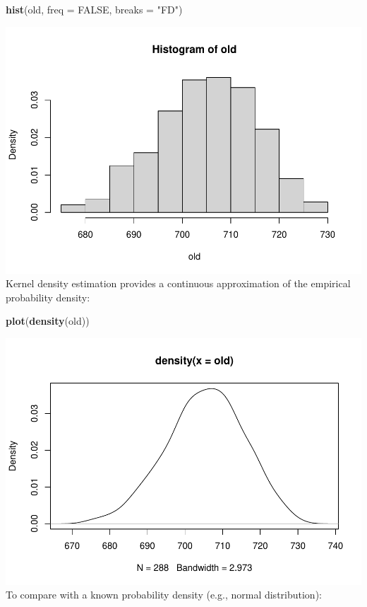 \documentclass[
]{article}
\newenvironment{Shaded}{\begin{snugshade}}{\end{snugshade}}
\newcommand{\AttributeTok}[1]{\textcolor[rgb]{0.13,0.29,0.53}{#1}}
\newcommand{\ConstantTok}[1]{\textcolor[rgb]{0.56,0.35,0.01}{#1}}
\newcommand{\FunctionTok}[1]{\textcolor[rgb]{0.13,0.29,0.53}{\textbf{#1}}}
\newcommand{\NormalTok}[1]{#1}
\newcommand{\StringTok}[1]{\textcolor[rgb]{0.31,0.60,0.02}{#1}}
\begin{document}
\begin{Shaded}
\begin{Highlighting}[]
\FunctionTok{hist}\NormalTok{(old, }\AttributeTok{freq =} \ConstantTok{FALSE}\NormalTok{, }\AttributeTok{breaks =} \StringTok{"FD"}\NormalTok{)}
\end{Highlighting}
\end{Shaded}

\includegraphics{EDA_files/figure-latex/unnamed-chunk-17-1.pdf} Kernel
density estimation provides a continuous approximation of the empirical
probability density:

\begin{Shaded}
\begin{Highlighting}[]
\FunctionTok{plot}\NormalTok{(}\FunctionTok{density}\NormalTok{(old))}
\end{Highlighting}
\end{Shaded}

\includegraphics{EDA_files/figure-latex/unnamed-chunk-18-1.pdf} To
compare with a known probability density (e.g., normal distribution):
\end{document}
